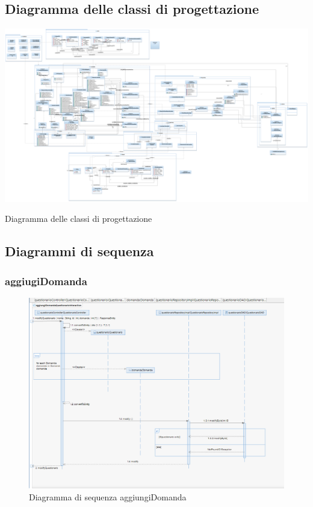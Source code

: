 \documentclass[12pt]{article}
\begin{document}
\subsection{Diagramma delle classi di progettazione}
\centering
\includegraphics[scale=0.18]{UNIMIBModule_UniMibClassDiagram.png}
\caption{Diagramma delle classi di progettazione}
\subsection{Diagrammi di sequenza}
\subsubsection{aggiugiDomanda}
\begin{figure}[H]
\centering
\includegraphics[scale=0.7]{UNIMIBModule_aggiungiDomandaQuestionarioSequenceDiagram.png}
\caption{Diagramma di sequenza aggiungiDomanda}
\end{figure}
\end{document}
